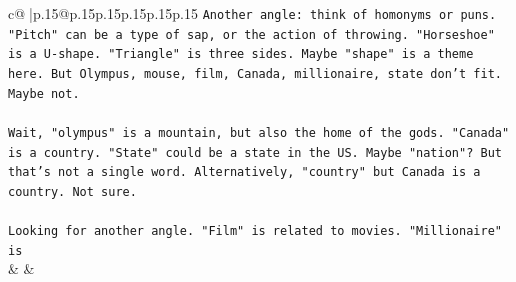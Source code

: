 \documentclass{article}
\begin{document}
{\begin{supertabular}{c@{$\;$}|p{.15\linewidth}@{}p{.15\linewidth}p{.15\linewidth}p{.15\linewidth}p{.15\linewidth}p{.15\linewidth}}
{{{\texttt{Another angle: think of homonyms or puns. "Pitch" can be a type of sap, or the action of throwing. "Horseshoe" is a U{-}shape. "Triangle" is three sides. Maybe "shape" is a theme here. But Olympus, mouse, film, Canada, millionaire, state don't fit. Maybe not.} \\
\\ 
\texttt{Wait, "olympus" is a mountain, but also the home of the gods. "Canada" is a country. "State" could be a state in the US. Maybe "nation"? But that's not a single word. Alternatively, "country" but Canada is a country. Not sure.} \\
\\ 
\texttt{Looking for another angle. "Film" is related to movies. "Millionaire" is} \\
            }
        }
    }
    & & \\ \\


\end{supertabular}}
\end{document}
